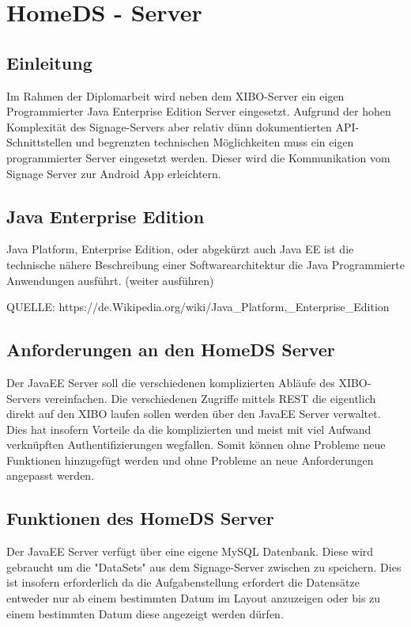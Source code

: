 \chapter{HomeDS - Server}
\section{Einleitung}\label{sec:einleitung}
Im Rahmen der Diplomarbeit wird neben dem XIBO-Server ein eigen Programmierter Java Enterprise Edition Server eingesetzt. Aufgrund der hohen Komplexität des Signage-Servers aber relativ dünn dokumentierten API-Schnittstellen und begrenzten technischen Möglichkeiten muss ein eigen programmierter Server eingesetzt werden. Dieser wird die Kommunikation vom Signage Server zur Android App erleichtern.  
 
\section{Java Enterprise Edition}\label{sec:javaee}
Java Platform, Enterprise Edition, oder abgekürzt auch Java EE ist die technische nähere Beschreibung einer Softwarearchitektur die Java Programmierte Anwendungen ausführt.
(weiter ausführen)

QUELLE: https://de.Wikipedia.org/wiki/Java_Platform,_Enterprise_Edition
 
\section{Anforderungen an den HomeDS Server}\label{sec:homeds}
Der JavaEE Server soll die verschiedenen komplizierten Abläufe des XIBO-Servers vereinfachen. Die verschiedenen Zugriffe mittels REST die eigentlich direkt auf den XIBO laufen sollen werden über den JavaEE Server verwaltet. Dies hat insofern Vorteile da die komplizierten und meist mit viel Aufwand verknüpften Authentifizierungen wegfallen. Somit können ohne Probleme neue Funktionen hinzugefügt werden und ohne Probleme an neue Anforderungen angepasst werden.
 
\section{Funktionen des HomeDS Server}\label{sec:homedsfunction}
Der JavaEE Server verfügt über eine eigene MySQL Datenbank. Diese wird gebraucht um die "DataSets" aus dem Signage-Server zwischen zu speichern. Dies ist insofern erforderlich da die Aufgabenstellung erfordert die Datensätze entweder nur ab einem bestimmten Datum im Layout anzuzeigen oder bis zu einem bestimmten Datum diese angezeigt werden dürfen. 
 
